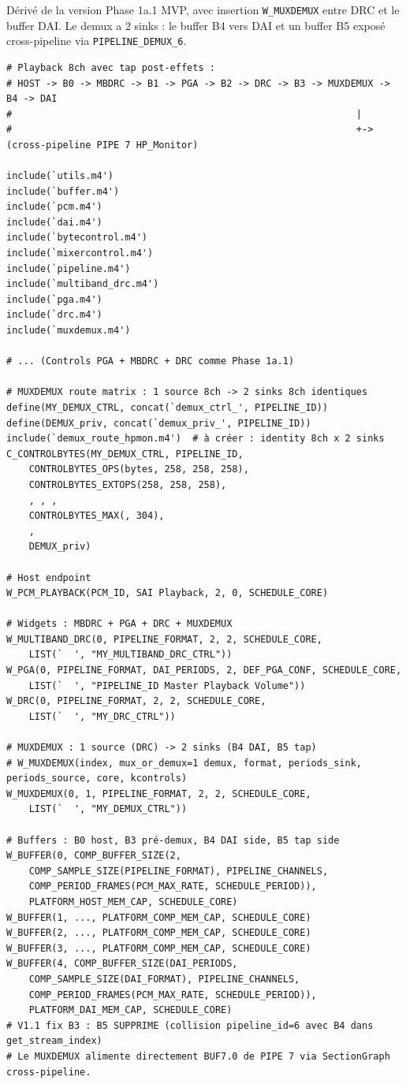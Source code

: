 \documentclass[11pt,a4paper]{article}
\begin{document}
Dérivé de la version Phase 1a.1 MVP, avec insertion \texttt{W\_MUXDEMUX} entre DRC et le buffer DAI. Le demux a 2 sinks : le buffer B4 vers DAI et un buffer B5 exposé cross-pipeline via \texttt{PIPELINE\_DEMUX\_6}.

\begin{lstlisting}[language={}, basicstyle=\ttfamily\scriptsize]
# Playback 8ch avec tap post-effets :
# HOST -> B0 -> MBDRC -> B1 -> PGA -> B2 -> DRC -> B3 -> MUXDEMUX -> B4 -> DAI
#                                                             |
#                                                             +-> (cross-pipeline PIPE 7 HP_Monitor)

include(`utils.m4')
include(`buffer.m4')
include(`pcm.m4')
include(`dai.m4')
include(`bytecontrol.m4')
include(`mixercontrol.m4')
include(`pipeline.m4')
include(`multiband_drc.m4')
include(`pga.m4')
include(`drc.m4')
include(`muxdemux.m4')

# ... (Controls PGA + MBDRC + DRC comme Phase 1a.1)

# MUXDEMUX route matrix : 1 source 8ch -> 2 sinks 8ch identiques
define(MY_DEMUX_CTRL, concat(`demux_ctrl_', PIPELINE_ID))
define(DEMUX_priv, concat(`demux_priv_', PIPELINE_ID))
include(`demux_route_hpmon.m4')  # à créer : identity 8ch x 2 sinks
C_CONTROLBYTES(MY_DEMUX_CTRL, PIPELINE_ID,
	CONTROLBYTES_OPS(bytes, 258, 258, 258),
	CONTROLBYTES_EXTOPS(258, 258, 258),
	, , ,
	CONTROLBYTES_MAX(, 304),
	,
	DEMUX_priv)

# Host endpoint
W_PCM_PLAYBACK(PCM_ID, SAI Playback, 2, 0, SCHEDULE_CORE)

# Widgets : MBDRC + PGA + DRC + MUXDEMUX
W_MULTIBAND_DRC(0, PIPELINE_FORMAT, 2, 2, SCHEDULE_CORE,
	LIST(`	', "MY_MULTIBAND_DRC_CTRL"))
W_PGA(0, PIPELINE_FORMAT, DAI_PERIODS, 2, DEF_PGA_CONF, SCHEDULE_CORE,
	LIST(`	', "PIPELINE_ID Master Playback Volume"))
W_DRC(0, PIPELINE_FORMAT, 2, 2, SCHEDULE_CORE,
	LIST(`	', "MY_DRC_CTRL"))

# MUXDEMUX : 1 source (DRC) -> 2 sinks (B4 DAI, B5 tap)
# W_MUXDEMUX(index, mux_or_demux=1 demux, format, periods_sink, periods_source, core, kcontrols)
W_MUXDEMUX(0, 1, PIPELINE_FORMAT, 2, 2, SCHEDULE_CORE,
	LIST(`	', "MY_DEMUX_CTRL"))

# Buffers : B0 host, B3 pré-demux, B4 DAI side, B5 tap side
W_BUFFER(0, COMP_BUFFER_SIZE(2,
	COMP_SAMPLE_SIZE(PIPELINE_FORMAT), PIPELINE_CHANNELS,
	COMP_PERIOD_FRAMES(PCM_MAX_RATE, SCHEDULE_PERIOD)),
	PLATFORM_HOST_MEM_CAP, SCHEDULE_CORE)
W_BUFFER(1, ..., PLATFORM_COMP_MEM_CAP, SCHEDULE_CORE)
W_BUFFER(2, ..., PLATFORM_COMP_MEM_CAP, SCHEDULE_CORE)
W_BUFFER(3, ..., PLATFORM_COMP_MEM_CAP, SCHEDULE_CORE)
W_BUFFER(4, COMP_BUFFER_SIZE(DAI_PERIODS,
	COMP_SAMPLE_SIZE(DAI_FORMAT), PIPELINE_CHANNELS,
	COMP_PERIOD_FRAMES(PCM_MAX_RATE, SCHEDULE_PERIOD)),
	PLATFORM_DAI_MEM_CAP, SCHEDULE_CORE)
# V1.1 fix B3 : B5 SUPPRIME (collision pipeline_id=6 avec B4 dans get_stream_index)
# Le MUXDEMUX alimente directement BUF7.0 de PIPE 7 via SectionGraph cross-pipeline.


\end{lstlisting}
\end{document}
